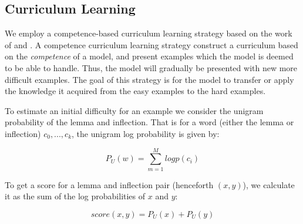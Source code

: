 \documentclass[11pt,a4paper]{article}
\newcommand\jp[1]{\textbf{JP: #1}}
\begin{document}


\subsection{Curriculum Learning}


We employ a competence-based curriculum learning strategy based on the
work of \cite{DBLP:conf/acl/LiuLWC20} and
\cite{platanios2019competence}. A competence curriculum learning
strategy construct a curriculum based on the \textit{competence} of a
model, and present examples which the model is deemed to be able to
handle. Thus, the model will gradually be presented with new more
difficult examples. The goal of this strategy is for the model to
transfer or apply the knowledge it acquired from the easy examples to
the hard examples.
 
To estimate an initial difficulty for an example we consider the
unigram probability of the lemma and inflection. That is for a word
(either the lemma or inflection) $c_0, ..., c_k$, the unigram log
probability is given by:

\begin{equation}
    P_U(w) = \sum_{m=1}^{M} logp(c_i)
\end{equation}

To get a score for a lemma and inflection pair (henceforth $(x,y)$),
we calculate it as the sum of the log probabilities of $x$ and $y$:

\begin{equation}
    score(x,y) = P_U(x) + P_U(y)
\end{equation}
\end{document}
